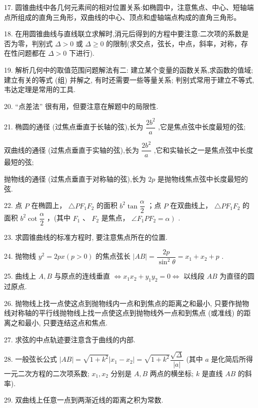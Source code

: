 17. 圆锥曲线中各几何元素间的相对位置关系:如椭圆中，注意焦点、中心、短轴端点所组成的直角三角形，双曲线的中心、顶点和虚轴端点构成的直角三角形。

18. 在用圆锥曲线与直线联立求解时,消元后得到的方程中要注意:二次项的系数是否为零，判别式 $\Delta  > 0$ 或 $\Delta  \geq  0$ 的限制(求交点，弦长，中点，斜率，对称，存在性问题都在 $\Delta  > 0$ 下进行).

19. 解析几何中的取值范围问题解法有二:   建立某个变量的函数关系,求函数的值域;   建立有关的等式 (组) 并解之, 有时还需要一些等量关系; 判别式常用于建立不等式, 韦达定理是常用的工具.

20. “点差法” 很有用，但要注意在解题中的局限性.

21. 椭圆的通径 (过焦点垂直于长轴的弦),长为 $\dfrac{2{b}^{2}}{a}$ ,它是焦点弦中长度最短的弦;

双曲线的通径 (过焦点垂直于实轴的弦),长为 $\dfrac{2{b}^{2}}{a}$ ,它和实轴长之一是焦点弦中长度最短的弦;

抛物线的通径 (过焦点垂直于对称轴的弦),长为 ${2p}$ 是抛物线焦点弦中长度最短的弦.

22. 点 $P$ 在椭圆上， $\bigtriangleup  P{F}_{1}{F}_{2}$ 的面积 ${b}^{2}\tan \dfrac{\alpha }{2}$ ；点 $P$ 在双曲线上， $\bigtriangleup  P{F}_{1}{F}_{2}$ 的面积 ${b}^{2}\cot \dfrac{\alpha }{2}$ ，(其中 ${F}_{1}$ 、 ${F}_{2}$ 是焦点， $\left. {\angle {F}_{1}P{F}_{2} = \alpha }\right)$ .

23. 求圆锥曲线的标准方程时, 要注意焦点所在的位置.

24. 抛物线 ${y}^{2} = {2px}\left( {p > 0}\right)$ 的焦点弦长 $\left| {AB}\right|  = \dfrac{2p}{{\sin }^{2}\theta } = {x}_{1} + {x}_{2} + p$ .

25. 曲线上 $A,B$ 与原点的连线垂直 $\Leftrightarrow  {x}_{1}{x}_{2} + {y}_{1}{y}_{2} = 0 \Leftrightarrow$ 以线段 ${AB}$ 为直径的圆过原点.

26. 抛物线上找一点使这点到抛物线内一点和到焦点的距离之和最小, 只要作抛物线对称轴的平行线抛物线上找一点使这点到抛物线外一点和到焦点 (或准线) 的距离之和最小, 只要连结这点和焦点.

27. 求弦的中点轨迹要注意含于曲线的内部.

28. 一般弦长公式 $\left| {AB}\right|  = \sqrt{1 + {k}^{2}}\left| {{x}_{1} - {x}_{2}}\right|  = \sqrt{1 + {k}^{2}}\dfrac{\sqrt{\Delta }}{\left| a\right| }$ (其中 $a$ 是化简后所得一元二次方程的二次项系数; ${x}_{1},{x}_{2}$ 分别是 $A,B$ 两点的横坐标; $k$ 是直线 ${AB}$ 的斜率).

29. 双曲线上任意一点到两渐近线的距离之积为常数.

